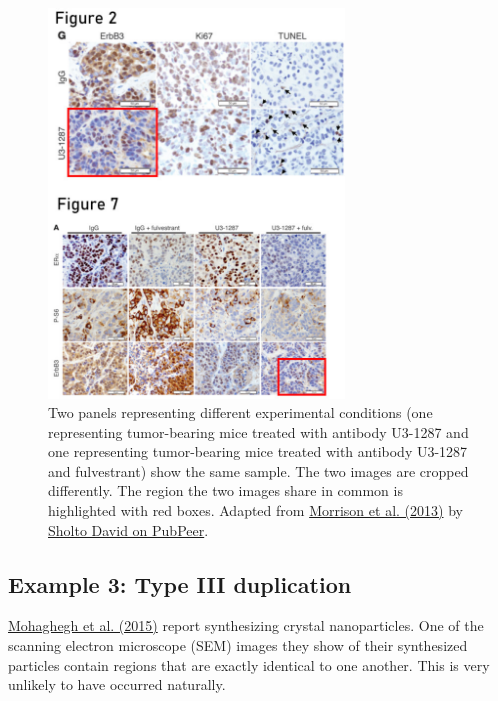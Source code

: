 \documentclass[letterpaper, 12pt]{article}
\begin{document}
\begin{figure}[h!tbp]
    \centering
    \includegraphics[width=0.7\textwidth]{img/image_duplication/image-1744937642757.jpg}
    \caption*{Two panels representing different experimental conditions (one representing tumor-bearing mice treated with antibody U3-1287 and one representing tumor-bearing mice treated with antibody U3-1287 and fulvestrant) show the same sample. The two images are cropped differently. The region the two images share in common is highlighted with red boxes. Adapted from \href{https://doi.org/10.1172/JCI66764}{Morrison et al. (2013)} by \href{https://pubpeer.com/publications/2768B5B42E7338AB72D4CFE660596A\#2}{Sholto David on PubPeer}.}
\end{figure}

\subsection*{Example 3: Type III duplication}

\href{https://doi.org/10.1007/s10853-015-9003-3}{Mohaghegh et al. (2015)} report synthesizing crystal nanoparticles. One of the scanning electron microscope (SEM) images they show of their synthesized particles contain regions that are exactly identical to one another. This is very unlikely to have occurred naturally.
\end{document}
